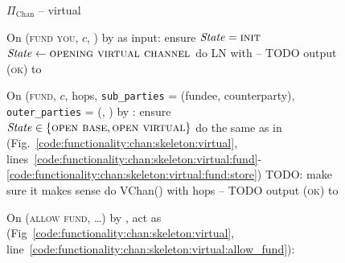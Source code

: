 \begin{figure}[H]
  \begin{protocolbox}{$\Pi_{\mathrm{Chan}}$ -- virtual}
    \begin{algorithmic}[1]
      \State {}
      \State {}
      \State On (\textsc{fund you}, $c$, \bob) by \charlie as input:
      \Indent
        \State ensure $\mathit{State} = \textsc{init}$
        \State $\mathit{State} \gets \textsc{opening virtual channel}$
        \State do LN with \bob{} -- TODO
        \State output (\textsc{ok}) to \charlie
      \EndIndent
      \Statex

      \State On (\textsc{fund}, $c$, hops, \texttt{sub\_parties} = (fundee,
      counterparty), \texttt{outer\_parties} = (\charlie, \dave) by
      \environment:
      \Indent
        \State ensure $\mathit{State} \in \{\textsc{open base}, \textsc{open
        virtual}\}$
        \State do the same as in \fchan
        (Fig.~\ref{code:functionality:chan:skeleton:virtual},
        lines~\ref{code:functionality:chan:skeleton:virtual:fund}-\ref{code:functionality:chan:skeleton:virtual:fund:store})
        TODO: make sure it makes sense
        \State do VChan() with hops -- TODO
        \State output (\textsc{ok}) to \environment
      \EndIndent
      \Statex

      \State {}
      \State On (\textsc{allow fund}, \dots) by \charlie, act as \fchan
      (Fig~\ref{code:functionality:chan:skeleton:virtual},
      line~\ref{code:functionality:chan:skeleton:virtual:allow_fund}):
    \end{algorithmic}
  \end{protocolbox}
  \caption{}
  \label{code:protocol:chan:skeleton:virtual}
\end{figure}
